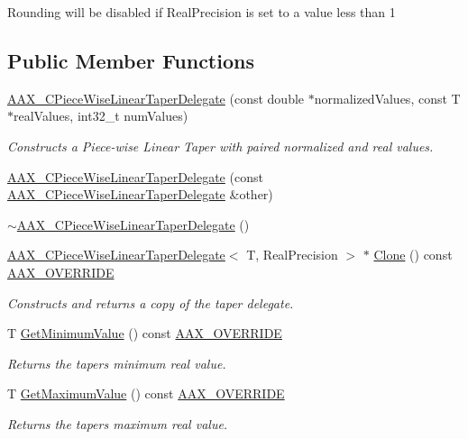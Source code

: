 Rounding will be disabled if Real\+Precision is set to a value less than 1 \subsection*{Public Member Functions}
\begin{DoxyCompactItemize}
\item 
\mbox{\hyperlink{a01553_a265a1e6a8f81a1ad8e1aad7ebfceb480}{A\+A\+X\+\_\+\+C\+Piece\+Wise\+Linear\+Taper\+Delegate}} (const double $\ast$normalized\+Values, const T $\ast$real\+Values, int32\+\_\+t num\+Values)
\begin{DoxyCompactList}\small\item\em Constructs a Piece-\/wise Linear Taper with paired normalized and real values. \end{DoxyCompactList}\item 
\mbox{\hyperlink{a01553_a39168e515e1670b03bf463aae266ed15}{A\+A\+X\+\_\+\+C\+Piece\+Wise\+Linear\+Taper\+Delegate}} (const \mbox{\hyperlink{a01553}{A\+A\+X\+\_\+\+C\+Piece\+Wise\+Linear\+Taper\+Delegate}} \&other)
\item 
\mbox{\hyperlink{a01553_a509915ce4f38ad211185baac8f37e13b}{$\sim$\+A\+A\+X\+\_\+\+C\+Piece\+Wise\+Linear\+Taper\+Delegate}} ()
\item 
\mbox{\hyperlink{a01553}{A\+A\+X\+\_\+\+C\+Piece\+Wise\+Linear\+Taper\+Delegate}}$<$ T, Real\+Precision $>$ $\ast$ \mbox{\hyperlink{a01553_ab8f9b4076d5d26f2fa8ce2ac34406241}{Clone}} () const \mbox{\hyperlink{a00392_ac2f24a5172689ae684344abdcce55463}{A\+A\+X\+\_\+\+O\+V\+E\+R\+R\+I\+DE}}
\begin{DoxyCompactList}\small\item\em Constructs and returns a copy of the taper delegate. \end{DoxyCompactList}\item 
T \mbox{\hyperlink{a01553_a3e136c26307ec35f70a38fb15b0480ba}{Get\+Minimum\+Value}} () const \mbox{\hyperlink{a00392_ac2f24a5172689ae684344abdcce55463}{A\+A\+X\+\_\+\+O\+V\+E\+R\+R\+I\+DE}}
\begin{DoxyCompactList}\small\item\em Returns the taper\textquotesingle{}s minimum real value. \end{DoxyCompactList}\item 
T \mbox{\hyperlink{a01553_a260b67b9ff2b06265c705c126d045507}{Get\+Maximum\+Value}} () const \mbox{\hyperlink{a00392_ac2f24a5172689ae684344abdcce55463}{A\+A\+X\+\_\+\+O\+V\+E\+R\+R\+I\+DE}}
\begin{DoxyCompactList}\small\item\em Returns the taper\textquotesingle{}s maximum real value. \end{DoxyCompactList}\item 

\end{DoxyCompactItemize}
